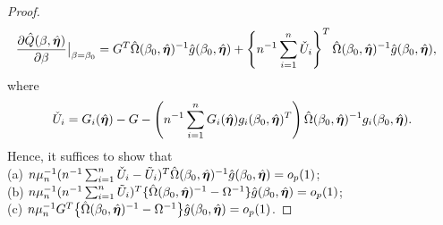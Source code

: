 \documentclass[12pt]{article}
\begin{document}
{\begin{proof}
\begin{align*}
&	\frac{\partial \hat{Q} (\beta, \hat {\bm \eta})}{\partial \beta}  \big|_{\beta= \beta_0} =  G^T \hat \Omega(\beta_0, \hat{\bm \eta})^{-1} \hat g(\beta_0, \hat{\bm \eta}) + \left\{n^{-1} \sum_{i=1}^n \check U_i \right\}^T \hat\Omega(\beta_0, \hat{\bm \eta})^{-1} \hat g(\beta_0, \hat {\bm \eta}),
\end{align*}
where 
\[
\check U_i=  G_i(\hat{\bm \eta})- G- \left( n^{-1} \sum_{i=1}^n G_i(\hat{\bm \eta})g_i(\beta_0, \hat{\bm \eta})^T \right) \hat\Omega(\beta_0, \hat{\bm \eta})^{-1} g_i(\beta_0, \hat{\bm \eta}).
\]
Hence, it suffices to show that\\
(a) $n\mu_n^{-1}( n^{-1} \sum_{i=1}^n \check U_i- \tilde U_i)^T \hat \Omega(\beta_0,\hat{\bm \eta})^{-1} \hat g(\beta_0,\hat{\bm \eta})=o_p(1)$;\\
(b) $n\mu_n^{-1}( n^{-1} \sum_{i=1}^n\tilde U_i)^T \{\hat \Omega(\beta_0,\hat{\bm \eta})^{-1} - \Omega^{-1}\}\hat g(\beta_0,\hat{\bm \eta})=o_p(1)$; \\
(c) $n\mu_n^{-1} G^T \big\{\hat \Omega(\beta_0,\hat{\bm \eta})^{-1} - \Omega^{-1} \big\} \hat g(\beta_0,\hat{\bm \eta})=o_p(1) $.


\end{proof}}
\end{document}
